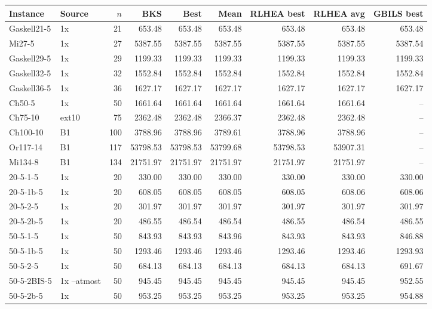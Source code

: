 \begin{longtable}{llrrrrrrr}
\hline
 Instance & Source & $n$ & BKS & Best & Mean & RLHEA best & RLHEA avg & GBILS best \\
\hline
\endhead
 Gaskell21-5 & 1x & 21 & 653.48 & 653.48 & 653.48 & 653.48 & 653.48 & 653.48 \\
 Mi27-5 & 1x & 27 & 5387.55 & 5387.55 & 5387.55 & 5387.55 & 5387.55 & 5387.54 \\
 Gaskell29-5 & 1x & 29 & 1199.33 & 1199.33 & 1199.33 & 1199.33 & 1199.33 & 1199.33 \\
 Gaskell32-5 & 1x & 32 & 1552.84 & 1552.84 & 1552.84 & 1552.84 & 1552.84 & 1552.84 \\
 Gaskell36-5 & 1x & 36 & 1627.17 & 1627.17 & 1627.17 & 1627.17 & 1627.17 & 1627.17 \\
 Ch50-5 & 1x & 50 & 1661.64 & 1661.64 & 1661.64 & 1661.64 & 1661.64 & -- \\
 Ch75-10 & ext10 & 75 & 2362.48 & 2362.48 & 2366.37 & 2362.48 & 2362.48 & -- \\
 Ch100-10 & B1 & 100 & 3788.96 & 3788.96 & 3789.61 & 3788.96 & 3788.96 & -- \\
 Or117-14 & B1 & 117 & 53798.53 & 53798.53 & 53799.68 & 53798.53 & 53907.31 & -- \\
 Mi134-8 & B1 & 134 & 21751.97 & 21751.97 & 21751.97 & 21751.97 & 21751.97 & -- \\
 20-5-1-5 & 1x & 20 & 330.00 & 330.00 & 330.00 & 330.00 & 330.00 & 330.00 \\
 20-5-1b-5 & 1x & 20 & 608.05 & 608.05 & 608.05 & 608.05 & 608.06 & 608.06 \\
 20-5-2-5 & 1x & 20 & 301.97 & 301.97 & 301.97 & 301.97 & 301.97 & 301.97 \\
 20-5-2b-5 & 1x & 20 & 486.55 & 486.54 & 486.54 & 486.55 & 486.54 & 486.55 \\
 50-5-1-5 & 1x & 50 & 843.93 & 843.93 & 843.96 & 843.93 & 843.93 & 846.88 \\
 50-5-1b-5 & 1x & 50 & 1293.46 & 1293.46 & 1293.46 & 1293.46 & 1293.46 & 1293.93 \\
 50-5-2-5 & 1x & 50 & 684.13 & 684.13 & 684.13 & 684.13 & 684.13 & 691.67 \\
 50-5-2BIS-5 & 1x --atmost & 50 & 945.45 & 945.45 & 945.45 & 945.45 & 945.45 & 952.55 \\
 50-5-2b-5 & 1x & 50 & 953.25 & 953.25 & 953.25 & 953.25 & 953.25 & 954.88 \\

\end{longtable}
